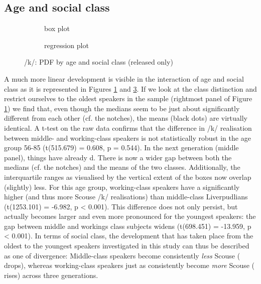 \subsection{Age and social class}
\label{sec.prod.res.con.k.ageclass}

\begin{figure}[h]
	\centering
	\begin{subfigure}{.49\textwidth}
		\centering
			\resizebox{\linewidth}{!}{} 
		\caption{box plot}
		\label{fig.box.k.ageclass}
	\end{subfigure}
	\begin{subfigure}{.49\textwidth}
		\centering
			\resizebox{\linewidth}{!}{} 
		\caption{regression plot}
		\label{fig.scatter.k.ageclass}
	\end{subfigure}
	\caption{/k/: PDF by age and social class (released only)}
\end{figure}

A much more linear development is visible in the interaction of age and social class as it is represented in Figures \ref{fig.box.k.ageclass} and \ref{fig.scatter.k.ageclass}.
If we look at the class distinction and restrict ourselves to the oldest speakers in the sample (rightmost panel of Figure \ref{fig.box.k.ageclass}) we find that, even though the medians seem to be just about significantly different from each other (cf. the notches), the means (black dots) are virtually identical.
A t-test on the raw data confirms that the difference in /k/ realisation between middle- and working-class speakers is not statistically robust in the age group 56-85 (t(515.679) = 0.608, p = 0.544).
In the next generation (middle panel), things have already d.
There is now a wider gap between both the medians (cf. the notches) and the means of the two classes.
Additionally, the interquartile ranges as visualised by the vertical extent of the boxes now overlap (slightly) less.
For this age group, working-class speakers have a significantly higher  (and thus more Scouse /k/ realisations) than middle-class Liverpudlians (t(1253.101) = -6.982, p < 0.001).
This difference does not only persist, but actually becomes larger and even more pronounced for the youngest speakers: the gap between middle and workings class subjects widens (t(698.451) = -13.959, p < 0.001).
In terms of social class, the development that has taken place from the oldest to the youngest speakers investigated in this study can thus be described as one of divergence: Middle-class speakers become consistently \emph{less} Scouse ( drops), whereas working-class speakers just as consistently become \emph{more} Scouse ( rises) across three generations.

